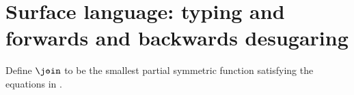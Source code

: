 \section{Surface language: typing and forwards and backwards desugaring}
\label{appendix:surface-language}





\begin{definition}
   Define $\disjjoin$ to be the smallest partial symmetric function satisfying the equations in .
\end{definition}








